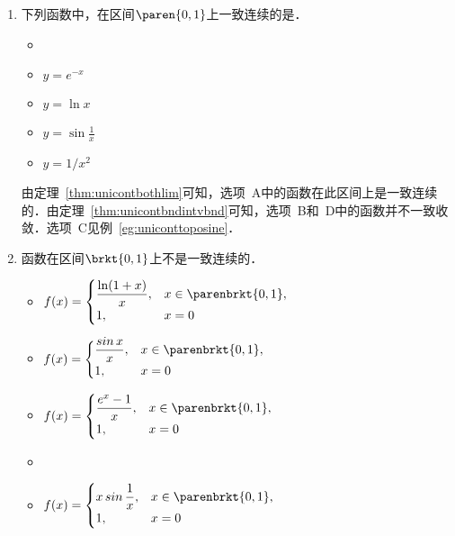 \begin{enumerate}
\item 下列函数中，在区间\(\paren{0,1}\)上一致连续的是\uline{\makebox[6em]{}}．
  \begin{itemize}
    \renewcommand{\labelitemi}{\faCircleThin}
    \ifshowsol
    \item[\faCircle]
    \else
    \item
    \fi
    \(y = e^{-x}\)
  \item \(y = \ln x\)
  \item \(y = \sin\frac1x\)     %
  \item \(y = 1/x^2\)
  \end{itemize}

  \ifshowsol
    由定理~\ref{thm:unicontbothlim}可知，选项~A中的函数在此区间上是一致连续的．由定理~\ref{thm:unicontbndintvbnd}可知，选项~B和~D中的函数并不一致收敛．选项~C见例~\ref{eg:uniconttoposine}．
  \fi

\item 函数\uline{\hspace{10em}}在区间\(\brkt{0,1}\)上不是一致连续的．
  \begin{itemize}
    \renewcommand{\labelitemi}{\faCircleThin}
  \item
    \begin{math}
      f(x) =
      \begin{cases}
        \dfrac{\ln(1+x)}{x}, & x \in \parenbrkt{0,1}, \\
        1, & x = 0
      \end{cases}
    \end{math}
  \item
    \begin{math}
      f(x) =
      \begin{cases}
        \dfrac{\sin x}{x}, & x \in \parenbrkt{0,1}, \\
        1, & x = 0
      \end{cases}
    \end{math}
  \item
    \begin{math}
      f(x) =
      \begin{cases}
        \dfrac{e^x-1}{x}, & x \in \parenbrkt{0,1}, \\
        1, & x = 0
      \end{cases}
    \end{math}
    \ifshowsol
    \item[\faCircle]
    \else
    \item
    \fi
    \begin{math}
      f(x) =
      \begin{cases}
        x \sin\dfrac1x, & x \in \parenbrkt{0,1}, \\
        1, & x = 0
      \end{cases}
    \end{math}
  \end{itemize}


\end{enumerate}

